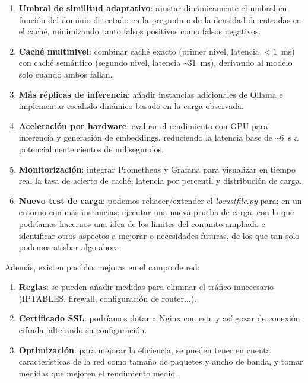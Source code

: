 \begin{enumerate}
    \item \textbf{Umbral de similitud adaptativo}: ajustar dinámicamente el umbral en función del dominio detectado en la pregunta o de la densidad de entradas en el caché, minimizando tanto falsos positivos como falsos negativos.
    
    \item \textbf{Caché multinivel}: combinar caché exacto (primer nivel, latencia $<1$~ms) con caché semántico (segundo nivel, latencia \textasciitilde31~ms), derivando al modelo solo cuando ambos fallan.
    
    \item \textbf{Más réplicas de inferencia}: añadir instancias adicionales de Ollama e implementar escalado dinámico basado en la carga observada.
    
    \item \textbf{Aceleración por hardware}: evaluar el rendimiento con GPU para inferencia y generación de embeddings, reduciendo la latencia base de \textasciitilde6~s a potencialmente cientos de milisegundos.
    
    \item \textbf{Monitorización}: integrar Prometheus y Grafana para visualizar en tiempo real la tasa de acierto de caché, latencia por percentil y distribución de carga.
  
    \item \textbf{Nuevo test de carga}: podemos rehacer/extender el \emph{locustfile.py} para; en un entorno con más instancias; ejecutar una nueva prueba de carga, con lo que podríamos hacernos una idea de los límites del conjunto ampliado e identificar otros aspectos a mejorar o necesidades futuras, de los que tan solo podemos atisbar algo ahora.
    
\end{enumerate}

Además, existen posibles mejoras en el campo de red:

\begin{enumerate}
    \item \textbf{Reglas}: se pueden añadir medidas para eliminar el tráfico innecesario (IPTABLES, firewall, configuración de router...).
    
    \item \textbf{Certificado SSL}: podríamos dotar a Nginx con este y así gozar de conexión cifrada, alterando su configuración.
    
    \item \textbf{Optimización}: para mejorar la eficiencia, se pueden tener en cuenta características de la red como tamaño de paquetes y ancho de banda, y tomar medidas que mejoren el rendimiento medio. 
\end{enumerate}

